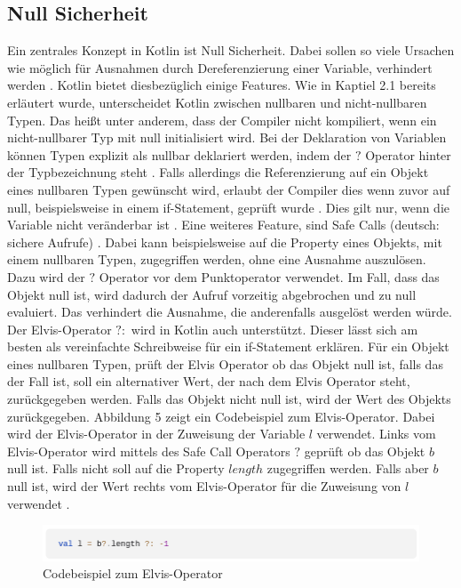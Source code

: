 \documentclass{article}
\begin{document}
\subsection{Null Sicherheit}
Ein zentrales Konzept in Kotlin ist Null Sicherheit. Dabei sollen so viele Ursachen wie möglich für Ausnahmen durch Dereferenzierung einer Variable, verhindert werden \cite{KotlinLangDoc}. Kotlin bietet diesbezüglich einige Features. Wie in Kaptiel 2.1 bereits erläutert wurde, unterscheidet Kotlin zwischen nullbaren und nicht-nullbaren Typen. Das heißt unter anderem, dass der Compiler nicht kompiliert, wenn ein nicht-nullbarer Typ mit null initialisiert wird. Bei der Deklaration von Variablen können Typen explizit als nullbar deklariert werden, indem der $?$ Operator hinter der Typbezeichnung steht \cite{KotlinLangDoc}. Falls allerdings die Referenzierung auf ein Objekt eines nullbaren Typen gewünscht wird, erlaubt der Compiler dies wenn zuvor auf null, beispielsweise in einem if-Statement, geprüft wurde \cite{KotlinLangDoc}. Dies gilt nur, wenn die Variable nicht veränderbar ist \cite{KotlinLangDoc}. \newline
Eine weiteres Feature, sind Safe Calls (deutsch: sichere Aufrufe) \cite{KotlinLangDoc}. Dabei kann beispielsweise auf die Property eines Objekts, mit einem nullbaren Typen, zugegriffen werden, ohne eine Ausnahme auszulösen. Dazu wird der $?$ Operator vor dem Punktoperator verwendet. Im Fall, dass das Objekt null ist, wird dadurch der Aufruf vorzeitig abgebrochen und zu null evaluiert. Das verhindert die Ausnahme, die anderenfalls ausgelöst werden würde. \newline
Der Elvis-Operator $?:$ wird in Kotlin auch unterstützt. Dieser lässt sich am besten als vereinfachte Schreibweise für ein if-Statement erklären. Für ein Objekt eines nullbaren Typen, prüft der Elvis Operator ob das Objekt null ist, falls das der Fall ist, soll ein alternativer Wert, der nach dem Elvis Operator steht, zurückgegeben werden. Falls das Objekt nicht null ist, wird der Wert des Objekts zurückgegeben. Abbildung 5 zeigt ein Codebeispiel zum Elvis-Operator. Dabei wird der Elvis-Operator in der Zuweisung der Variable $l$ verwendet. Links vom Elvis-Operator wird mittels des Safe Call Operators $?$ geprüft ob das Objekt $b$ null ist. Falls nicht soll auf die Property $length$ zugegriffen werden. Falls aber $b$ null ist, wird der Wert rechts vom Elvis-Operator für die Zuweisung von $l$ verwendet \cite{KotlinLangDoc}.
\begin{figure}[!htb]
    \centering
    \includegraphics[width=\linewidth]{img/Elvis_operator.png}
    \caption{Codebeispiel zum Elvis-Operator\footnotemark}
\end{figure}
\end{document}
